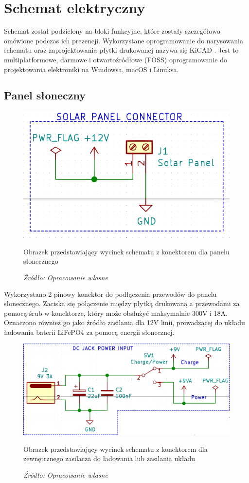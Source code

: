 \documentclass[12pt,a4paper,oneside]{memoir}
\begin{document}
\chapter{Schemat elektryczny}
\par Schemat został podzielony na bloki funkcyjne, które zostały szczegółowo omówione podczas ich prezencji. Wykorzystane oprogramowanie do narysowania schematu oraz zaprojektowania płytki drukowanej nazywa się KiCAD \cite{kicad}. Jest to multiplatformowe, darmowe i otwartoźródłowe (FOSS) oprogramowanie do projektowania elektroniki na Windowsa, macOS i Linuksa.
\section{Panel słoneczny}
\begin{figure}[!h]
	\centering
	\includegraphics[scale=0.3]{images/sch/sch-01.png}
	{\tytulyrozdzialow \footnotesize \caption[Schemat - konektor panelu słonecznego] {Obrazek przedstawiający wycinek schematu z konektorem dla panelu słonecznego }}
	\caption*{\textit{Źródło: Opracowanie własne}}
\end{figure}
\par Wykorzystano 2 pinowy konektor do podłączenia przewodów do panelu słonecznego. Zaciska się połączenie między płytką drukowaną a przewodami za pomocą śrub w konektorze, który może obsłużyć maksymalnie 300V i 18A. Oznaczono również go jako źródło zasilania dla 12V linii, prowadzącej do układu ładowania baterii LiFePO4 za pomocą energii słonecznej.
\begin{figure}[!h]
	\centering
	\includegraphics[scale=0.8]{images/sch/sch-02.png}
	{\tytulyrozdzialow \footnotesize \caption[Schemat - konektor zewnętrznego ładowania/zasilania] {Obrazek przedstawiający wycinek schematu z konektorem dla zewnętrznego zasilacza do ładowania lub zasilania układu }}
	\caption*{\textit{Źródło: Opracowanie własne}}
\end{figure}
\end{document}
